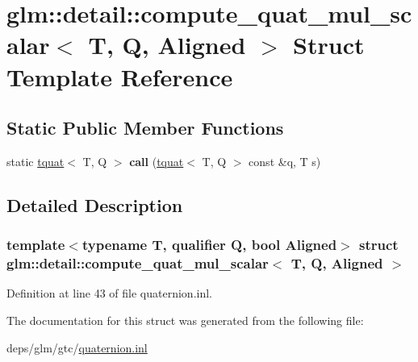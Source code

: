 \hypertarget{structglm_1_1detail_1_1compute__quat__mul__scalar}{}\section{glm\+:\+:detail\+:\+:compute\+\_\+quat\+\_\+mul\+\_\+scalar$<$ T, Q, Aligned $>$ Struct Template Reference}
\label{structglm_1_1detail_1_1compute__quat__mul__scalar}
\subsection*{Static Public Member Functions}
\begin{DoxyCompactItemize}
\item 
\mbox{\label{structglm_1_1detail_1_1compute__quat__mul__scalar_abc5cbc89b3e84f7a3dedca119fbded4d}} 
static \hyperlink{structglm_1_1tquat}{tquat}$<$ T, Q $>$ {\bfseries call} (\hyperlink{structglm_1_1tquat}{tquat}$<$ T, Q $>$ const \&q, T s)
\end{DoxyCompactItemize}


\subsection{Detailed Description}
\subsubsection*{template$<$typename T, qualifier Q, bool Aligned$>$\newline
struct glm\+::detail\+::compute\+\_\+quat\+\_\+mul\+\_\+scalar$<$ T, Q, Aligned $>$}



Definition at line 43 of file quaternion.\+inl.



The documentation for this struct was generated from the following file\+:\begin{DoxyCompactItemize}
\item 
deps/glm/gtc/\hyperlink{gtc_2quaternion_8inl}{quaternion.\+inl}\end{DoxyCompactItemize}
